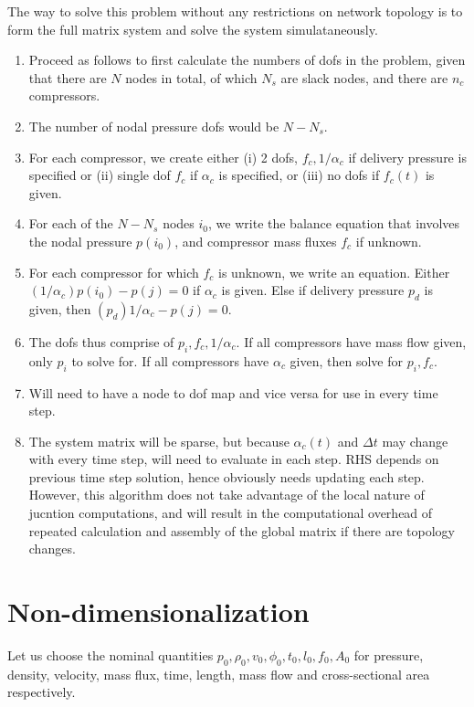 \documentclass{amsart}
\begin{document}
The way to solve this problem without any restrictions on network topology is to form the full matrix system and solve the system simulataneously.
\begin{enumerate}
\item Proceed as follows to first calculate the numbers of dofs in the problem, given that there are $N$ nodes in total, of which $N_s$ are slack nodes, and there are $n_c$ compressors.
\item The number of nodal pressure dofs would be $N - N_s$. 
\item For each compressor, we create either (i) 2 dofs, $f_c, 1/\alpha_c$ if delivery pressure is specified or (ii) single dof $f_c$ if $\alpha_c$ is specified, or (iii) no dofs if $f_c(t)$ is given.
\item For each of the $N- N_s$ nodes $i_0$, we write the balance equation that involves the nodal pressure $p(i_0)$, and compressor mass fluxes $f_c$ if unknown. 
\item For each compressor for which $f_c$ is unknown, we write an equation. Either $(1/\alpha_c)p(i_0) - p(j) = 0$ if $\alpha_c$ is given. Else if delivery pressure $p_d$ is given, then $(p_d)1/\alpha_c - p(j) = 0$.
\item The dofs thus comprise of $p_i, f_c, 1/\alpha_c$. If all compressors have mass flow given, only $p_i$ to solve for. If all compressors have $\alpha_c$ given, then solve for $p_i, f_c$.
\item Will need to have a node to dof map and vice versa for use in every time step.
\item The system matrix will be sparse, but because $\alpha_c(t)$ and $\Delta t$ may change with every time step, will need to evaluate in each step. RHS depends on previous time step solution, hence obviously needs updating each step.
However, this algorithm does not take advantage of the local nature  of jucntion computations, and will result in the computational overhead  of repeated calculation and assembly of the global matrix if there are topology changes.
\end{enumerate}

\section{Non-dimensionalization}
Let us choose the nominal quantities $p_0, \rho_0, v_0, \phi_0, t_0, l_0,f_0, A_0$ for pressure, density, velocity, mass flux, time, length, mass flow and cross-sectional area respectively.
\end{document}

